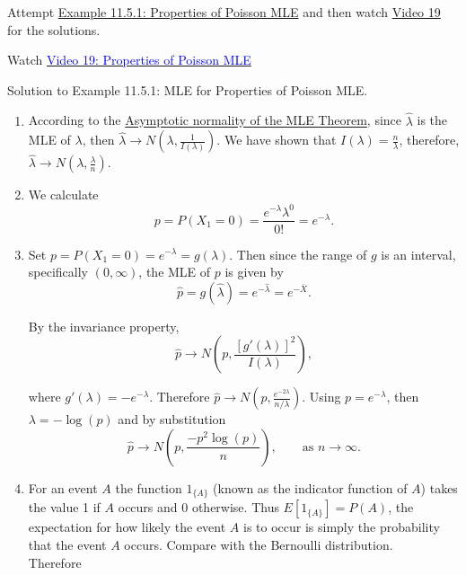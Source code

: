 \documentclass[
]{book}
\providecommand{\tightlist}{%
  \setlength{\itemsep}{0pt}\setlength{\parskip}{0pt}}
\begin{document}
Attempt \protect\hyperlink{MLEprop:exer:Poisson}{Example 11.5.1: Properties of Poisson MLE} and then watch \protect\hyperlink{video19}{Video 19} for the solutions.

Watch \href{https://mediaspace.nottingham.ac.uk/media/Poisson+MLE+FINAL+VERSION/1_jo1eknzh}{\textcolor{blue}{Video 19: Properties of Poisson MLE}}

Solution to Example 11.5.1: MLE for Properties of Poisson MLE.

\begin{enumerate}
\def\labelenumi{(\alph{enumi})}
\tightlist
\item
  According to the \protect\hyperlink{MLEprop:thm:normal_MLE}{Asymptotic normality of the MLE Theorem}, since \(\hat{\lambda}\) is the MLE of \(\lambda\), then \(\hat{\lambda} \rightarrow N\left( \lambda, \frac{1}{I(\lambda)} \right)\). We have shown that \(I(\lambda) = \frac{n}{\lambda}\), therefore, \(\hat{\lambda} \rightarrow N \left( \lambda, \frac{\lambda}{n} \right)\).\\
\item
  We calculate\\

  \[p= P(X_1 = 0) = \frac{e^{-\lambda} \lambda^0 }{0!} = e^{-\lambda}.\]
\item
  Set \(p = P(X_1 = 0) = e^{-\lambda} = g(\lambda)\). Then since the range of \(g\) is an interval, specifically \((0,\infty)\), the MLE of \(p\) is given by\\

  \[\hat{p} = g(\hat{\lambda}) = e^{-\hat{\lambda}} = e^{-\bar{X}}.\]

  By the invariance property,\\

  \[\hat{p} \rightarrow N \left(p, \frac{ \left[ g'(\lambda) \right]^2 }{I(\lambda)} \right),\]

  where \(g'(\lambda) = -e^{-\lambda}\). Therefore \(\hat{p} \rightarrow N \left( p, \frac{e^{-2\lambda}}{n/\lambda} \right)\). Using \(p = e^{-\lambda}\), then \(\lambda = -\log(p)\) and by substitution\\

  \[\hat{p} \rightarrow N \left( p, \frac{ -p^2 \log(p) }{n} \right), \qquad \text{as } n \rightarrow \infty.\]
\item
  For an event \(A\) the function \(1_{\{A\}}\) (known as the indicator function of \(A\)) takes the value 1 if \(A\) occurs and 0 otherwise. Thus \(E[1_{\{A\}}] = P(A)\), the expectation for how likely the event \(A\) is to occur is simply the probability that the event \(A\) occurs. Compare with the Bernoulli distribution.\\
  Therefore\\


\end{enumerate}
\end{document}
